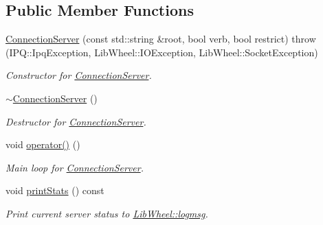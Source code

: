 \subsection*{\-Public \-Member \-Functions}
\begin{DoxyCompactItemize}
\item 
\hyperlink{classNERD_1_1ConnectionServer_acc6df09182bd47a744638d2784a7f3df}{\-Connection\-Server} (const std\-::string \&root, bool verb, bool restrict)  throw (\-I\-P\-Q\-::\-Ipq\-Exception, Lib\-Wheel\-::\-I\-O\-Exception, Lib\-Wheel\-::\-Socket\-Exception)
\begin{DoxyCompactList}\small\item\em \-Constructor for \hyperlink{classNERD_1_1ConnectionServer}{\-Connection\-Server}. \end{DoxyCompactList}\item 
\hyperlink{classNERD_1_1ConnectionServer_abd4458dd96ff0b366de34ecf24855ec4}{$\sim$\-Connection\-Server} ()
\begin{DoxyCompactList}\small\item\em \-Destructor for \hyperlink{classNERD_1_1ConnectionServer}{\-Connection\-Server}. \end{DoxyCompactList}\item 
void \hyperlink{classNERD_1_1ConnectionServer_af506b23a0c81f40f8f449bb388005424}{operator()} ()
\begin{DoxyCompactList}\small\item\em \-Main loop for \hyperlink{classNERD_1_1ConnectionServer}{\-Connection\-Server}. \end{DoxyCompactList}\item 
void \hyperlink{classNERD_1_1ConnectionServer_a52574c2792a324c56435234da19cc183}{print\-Stats} () const 
\begin{DoxyCompactList}\small\item\em \-Print current server status to \hyperlink{namespaceLibWheel_af4ca70f4f65b2948701218436516a679}{\-Lib\-Wheel\-::logmsg}. \end{DoxyCompactList}\end{DoxyCompactItemize}
